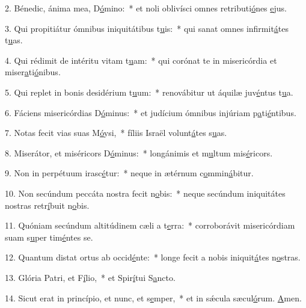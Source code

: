 2. Bénedic, ánima mea, D\uline{ó}mino:~* et noli oblivísci omnes retributi\uline{ó}nes \uline{e}jus.\par 
3. Qui propitiátur ómnibus iniquitátibus t\uline{u}is:~* qui sanat omnes infirmit\uline{á}tes t\uline{u}as.\par 
4. Qui rédimit de intéritu vitam t\uline{u}am:~* qui corónat te in misericórdia et miser\uline{a}ti\uline{ó}nibus.\par 
5. Qui replet in bonis desidérium t\uline{u}um:~* renovábitur ut áquilæ juv\uline{é}ntus t\uline{u}a.\par 
6. Fáciens misericórdias D\uline{ó}minus:~* et judícium ómnibus injúriam p\uline{a}ti\uline{é}ntibus.\par 
7. Notas fecit vias suas M\uline{ó}ysi,~* fíliis Israël volunt\uline{á}tes s\uline{u}as.\par 
8. Miserátor, et miséricors D\uline{ó}minus:~* longánimis et m\uline{u}ltum mis\uline{é}ricors.\par 
9. Non in perpétuum irasc\uline{é}tur:~* neque in ætérnum c\uline{o}mmin\uline{á}bitur.\par 
10. Non secúndum peccáta nostra fecit n\uline{o}bis:~* neque secúndum iniquitátes nostras retr\uline{í}buit n\uline{o}bis.\par 
11. Quóniam secúndum altitúdinem cæli a t\uline{e}rra:~* corroborávit misericórdiam suam s\uline{u}per tim\uline{é}ntes se.\par 
12. Quantum distat ortus ab occid\uline{é}nte:~* longe fecit a nobis iniquit\uline{á}tes n\uline{o}stras.\par 
13. Glória Patri, et F\uline{í}lio,~* et Spir\uline{í}tui S\uline{a}ncto.\par 
14. Sicut erat in princípio, et nunc, et s\uline{e}mper,~* et in sǽcula sæcul\uline{ó}rum. \uline{A}men.\par 
